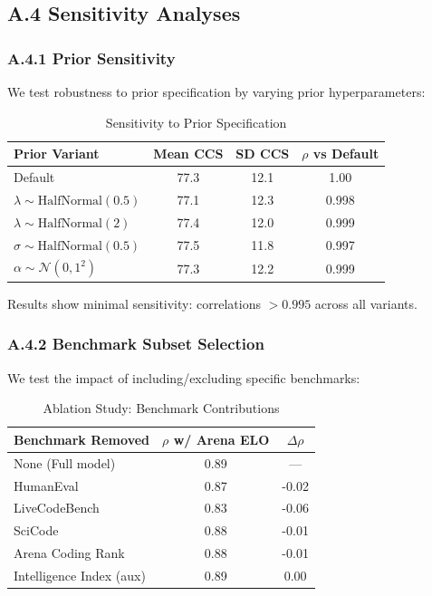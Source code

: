 \subsection*{A.4 Sensitivity Analyses}

\subsubsection*{A.4.1 Prior Sensitivity}

We test robustness to prior specification by varying prior hyperparameters:

\begin{table}[h]
\centering
\caption{Sensitivity to Prior Specification}
\begin{tabular}{lccc}
\toprule
\textbf{Prior Variant} & \textbf{Mean CCS} & \textbf{SD CCS} & \textbf{$\rho$ vs Default} \\
\midrule
Default & 77.3 & 12.1 & 1.00 \\
$\lambda \sim \text{HalfNormal}(0.5)$ & 77.1 & 12.3 & 0.998 \\
$\lambda \sim \text{HalfNormal}(2)$ & 77.4 & 12.0 & 0.999 \\
$\sigma \sim \text{HalfNormal}(0.5)$ & 77.5 & 11.8 & 0.997 \\
$\alpha \sim \mathcal{N}(0, 1^2)$ & 77.3 & 12.2 & 0.999 \\
\bottomrule
\end{tabular}
\end{table}

Results show minimal sensitivity: correlations $> 0.995$ across all variants.

\subsubsection*{A.4.2 Benchmark Subset Selection}

We test the impact of including/excluding specific benchmarks:

\begin{table}[h]
\centering
\caption{Ablation Study: Benchmark Contributions}
\begin{tabular}{lcc}
\toprule
\textbf{Benchmark Removed} & \textbf{$\rho$ w/ Arena ELO} & \textbf{$\Delta\rho$} \\
\midrule
None (Full model) & 0.89 & --- \\
HumanEval & 0.87 & -0.02 \\
LiveCodeBench & 0.83 & -0.06 \\
SciCode & 0.88 & -0.01 \\
Arena Coding Rank & 0.88 & -0.01 \\
Intelligence Index (aux) & 0.89 & 0.00 \\
\bottomrule
\end{tabular}
\end{table}

